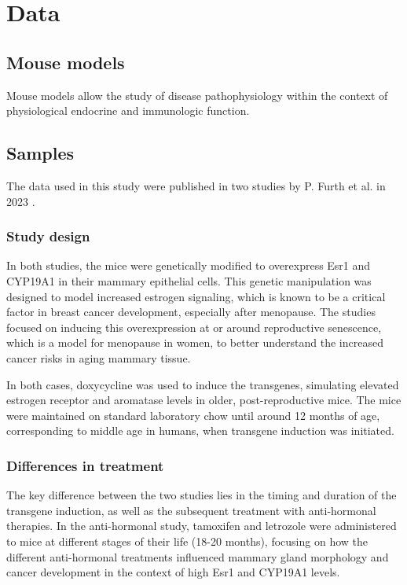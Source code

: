 \section{Data}
\label{sec:data}

\subsection{Mouse models}
Mouse models allow the study of disease pathophysiology within the context of
physiological endocrine and immunologic function.

\subsection{Samples}
The data used in this study were published in two studies by P.
Furth et al.
in 2023
\supercite{furth_esr1_2023,furth_overexpression_2023}.

\subsubsection{Study design}
In both studies, the mice were genetically modified to overexpress Esr1 and
CYP19A1 in their mammary epithelial cells.
This genetic manipulation was designed to model increased estrogen signaling,
which is known to be a critical factor in breast cancer development, especially
after menopause.
The studies focused on inducing this overexpression at or around reproductive
senescence, which is a model for menopause in women, to better understand the
increased cancer risks in aging mammary tissue.

In both cases, doxycycline was used to induce the transgenes, simulating
elevated estrogen receptor and aromatase levels in older, post-reproductive
mice.
The mice were maintained on standard laboratory chow until around 12 months of
age, corresponding to middle age in humans, when transgene induction was
initiated.

\subsubsection{Differences in treatment}
The key difference between the two studies lies in the timing and duration of
the transgene induction, as well as the subsequent treatment with anti-hormonal
therapies.
In the anti-hormonal study, tamoxifen and letrozole were administered to mice
at different stages of their life (18-20 months), focusing on how the different
anti-hormonal treatments influenced mammary gland morphology and cancer
development in the context of high Esr1 and CYP19A1 levels.

